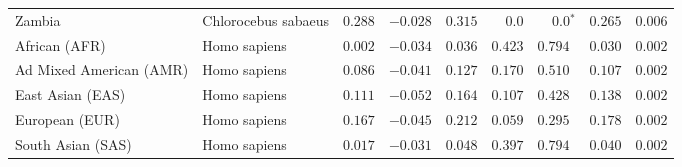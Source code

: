 \begin{center}
\begin{adjustbox}{width = 1\textwidth}
\begin{tabular}{|l|l|r|r|r|r|r|r|r|}
            Zambia        & Chlorocebus sabaeus        & $ 0.288$ & $-0.028$   & $ 0.315$ & $0.0$ & $\bm{0.0{^*}}$ & $ 0.265$ & $ 0.006$ \\
            African (AFR)               & Homo sapiens        & $ 0.002$ & $-0.034$   & $ 0.036$ & $ 0.423$ & $ 0.794~~$     & $ 0.030$ & $ 0.002$ \\
            Ad Mixed American (AMR)                 & Homo sapiens        & $ 0.086$ & $-0.041$   & $ 0.127$ & $ 0.170$ & $ 0.510~~$     & $ 0.107$ & $ 0.002$ \\
            East Asian (EAS)              & Homo sapiens        & $ 0.111$ & $-0.052$   & $ 0.164$ & $ 0.107$ & $ 0.428~~$     & $ 0.138$ & $ 0.002$ \\
            European (EUR)              & Homo sapiens        & $ 0.167$ & $-0.045$   & $ 0.212$ & $ 0.059$ & $ 0.295~~$     & $ 0.178$ & $ 0.002$ \\
            South Asian (SAS)              & Homo sapiens        & $ 0.017$ & $-0.031$   & $ 0.048$ & $ 0.397$ & $ 0.794~~$     & $ 0.040$ & $ 0.002$ \\
            \bottomrule
        \end{tabular}
    \end{adjustbox}
\end{center}
